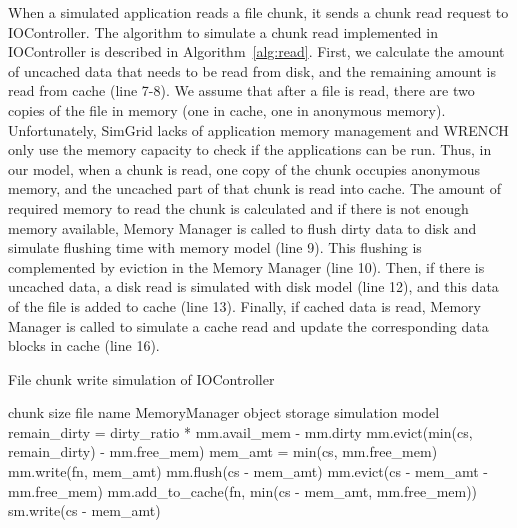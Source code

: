 \documentclass[conference]{IEEEtran}
\newcommand{\Desc}[2]{\State \makebox[2em][l]{#1}#2}
\begin{document}
			When a simulated application reads a file chunk, it sends a chunk read request 
			to IOController. 			
			The algorithm to simulate a chunk read implemented in IOController 
			is described in Algorithm~\ref{alg:read}.   
			First, we calculate the amount of uncached data that needs to be read 
			from disk, and the remaining amount is read from cache (line 7-8).
			We assume that after a file is read, there are two copies of the file in memory 
			(one in cache, one in anonymous memory). 
			Unfortunately, SimGrid lacks of application memory management and WRENCH 
			only use the memory capacity to check if the applications can be run. 
			Thus, in our model, when a chunk is read, one copy of the chunk 
			occupies anonymous memory, and the uncached part of that chunk is 
			read into cache.	
			The amount of required memory to read the chunk is calculated and 
			if there is not enough memory available, Memory Manager is called to 
			flush dirty data to disk and simulate flushing time with memory model (line 9). 
			This flushing is complemented by eviction in the Memory Manager (line 10). 
			Then, if there is uncached data, a disk read is simulated with disk model (line 12), 
			and this data of the file is added to cache (line 13).
			Finally, if cached data is read, Memory Manager is called to simulate a cache read  
			and update the corresponding data blocks in cache (line 16).

			\begin{algorithm}\caption{File chunk write simulation of IOController}
			\label{alg:write}
				\small
				\begin{algorithmic}[1]
					\Input
        				\Desc{cs}{chunk size}
        				\Desc{fn}{file name}
						\Desc{mm}{MemoryManager object}
						\Desc{sm}{storage simulation model}
   					\EndInput
					\State remain\_dirty = dirty\_ratio * mm.avail\_mem - mm.dirty
					 
    					\State mm.evict(min(cs, remain\_dirty) - mm.free\_mem)
    					\State mem\_amt = min(cs, mm.free\_mem)
    					\State mm.write(fn, mem\_amt) 
    				\EndIf
					  
						\State mm.flush(cs - mem\_amt)  
						\State mm.evict(cs - mem\_amt  - mm.free\_mem) 
						\State mm.add\_to\_cache(fn, min(cs - mem\_amt, mm.free\_mem))
						\State sm.write(cs - mem\_amt)
					\EndIf
					
				\end{algorithmic}
			\end{algorithm}
\end{document}

